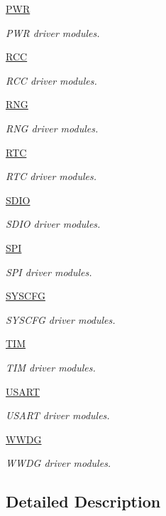 \begin{DoxyCompactItemize}
\hyperlink{group___p_w_r}{P\+W\+R}
\begin{DoxyCompactList}\small\item\em P\+W\+R driver modules. \end{DoxyCompactList}\item 
\hyperlink{group___r_c_c}{R\+C\+C}
\begin{DoxyCompactList}\small\item\em R\+C\+C driver modules. \end{DoxyCompactList}\item 
\hyperlink{group___r_n_g}{R\+N\+G}
\begin{DoxyCompactList}\small\item\em R\+N\+G driver modules. \end{DoxyCompactList}\item 
\hyperlink{group___r_t_c}{R\+T\+C}
\begin{DoxyCompactList}\small\item\em R\+T\+C driver modules. \end{DoxyCompactList}\item 
\hyperlink{group___s_d_i_o}{S\+D\+I\+O}
\begin{DoxyCompactList}\small\item\em S\+D\+I\+O driver modules. \end{DoxyCompactList}\item 
\hyperlink{group___s_p_i}{S\+P\+I}
\begin{DoxyCompactList}\small\item\em S\+P\+I driver modules. \end{DoxyCompactList}\item 
\hyperlink{group___s_y_s_c_f_g}{S\+Y\+S\+C\+F\+G}
\begin{DoxyCompactList}\small\item\em S\+Y\+S\+C\+F\+G driver modules. \end{DoxyCompactList}\item 
\hyperlink{group___t_i_m}{T\+I\+M}
\begin{DoxyCompactList}\small\item\em T\+I\+M driver modules. \end{DoxyCompactList}\item 
\hyperlink{group___u_s_a_r_t}{U\+S\+A\+R\+T}
\begin{DoxyCompactList}\small\item\em U\+S\+A\+R\+T driver modules. \end{DoxyCompactList}\item 
\hyperlink{group___w_w_d_g}{W\+W\+D\+G}
\begin{DoxyCompactList}\small\item\em W\+W\+D\+G driver modules. \end{DoxyCompactList}\end{DoxyCompactItemize}


\subsection{Detailed Description}
